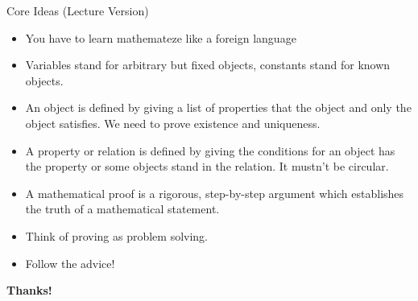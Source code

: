 \documentclass[../slides.tex]{subfiles}
\begin{document}
\begin{frame}{Core Ideas (Lecture Version)}
	
\begin{itemize}

		\item You have to learn mathemateze like a foreign language

		\item Variables stand for arbitrary but fixed objects, constants stand for known objects. 

		\item An object is defined by giving a list of properties that the object and only the object satisfies. We need to prove existence and uniqueness. 	
				
		\item A property or relation is defined by giving the conditions for an object has the property or some objects stand in the relation. It mustn't be circular.
		
		\item  A mathematical proof is a rigorous, step-by-step argument which establishes the truth of a mathematical statement. 


		\item Think of proving as problem solving. 
		
		\item Follow the advice!

	\end{itemize}


\end{frame}

\begin{frame}

	\begin{center}
	{\huge\bf Thanks!}
	\end{center}

\end{frame}
\end{document}
